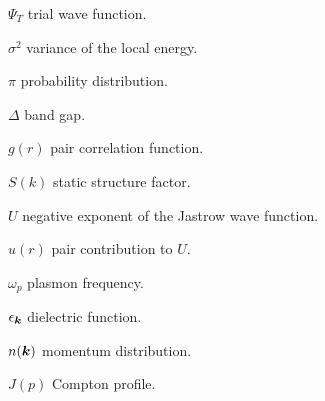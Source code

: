 \begin{symbollist}[0.7in]
\item[$\Psi_T$] trial wave function.
\item[$\sigma^2$] variance of the local energy.
\item[$\pi$] probability distribution.
\item[$\Delta$] band gap.
\item[$g(r)$] pair correlation function.
\item[$S(k)$] static structure factor.
\item[$U$] negative exponent of the Jastrow wave function.
\item[$u(r)$] pair contribution to $U$.
\item[$\omega_p$] plasmon frequency.
\item[$\epsilon_{\boldsymbol{k}}$] dielectric function.
\item[$n(\boldsymbol{k})$] momentum distribution.
\item[$J(p)$] Compton profile.
\end{symbollist}